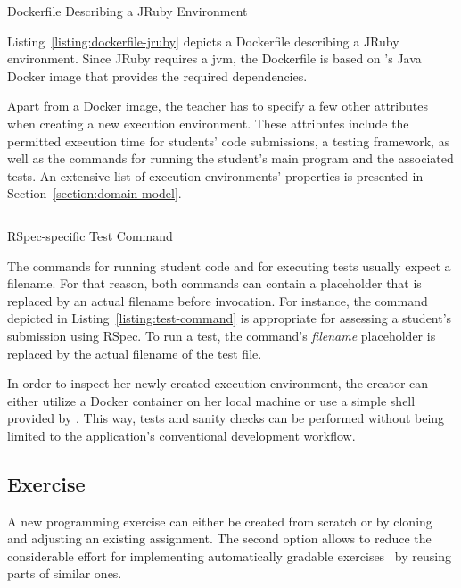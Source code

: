 \begin{listing}
\inputminted[frame=lines]{Dockerfile}{listings/Dockerfile-jruby}
\vspace{-0.33cm}
\caption{Dockerfile Describing a JRuby Environment}
\label{listing:dockerfile-jruby}
\end{listing}

Listing~\ref{listing:dockerfile-jruby} depicts a Dockerfile describing a JRuby environment. Since JRuby requires a \gls{jvm}, the Dockerfile is based on \tool's Java Docker image that provides the required dependencies.

Apart from a Docker image, the teacher has to specify a few other attributes when creating a new execution environment. These attributes include the permitted execution time for students' code submissions, a testing framework, as well as the commands for running the student's main program and the associated tests. An extensive list of execution environments' properties is presented in Section~\ref{section:domain-model}.

\begin{listing}
\inputminted[frame=lines]{text}{listings/test-command.txt}
\vspace{-0.33cm}
\caption{RSpec-specific Test Command}
\label{listing:test-command}
\end{listing}

The commands for running student code and for executing tests usually expect a filename. For that reason, both commands can contain a placeholder that is replaced by an actual filename before invocation. For instance, the command depicted in Listing~\ref{listing:test-command} is appropriate for assessing a student's submission using RSpec. To run a test, the command's \emph{filename} placeholder is replaced by the actual filename of the test file.

In order to inspect her newly created execution environment, the creator can either utilize a Docker container on her local machine or use a simple shell provided by \tool. This way, tests and sanity checks can be performed without being limited to the application's conventional development workflow.

\subsection{Exercise}

A new programming exercise can either be created from scratch or by cloning and adjusting an existing assignment. The second option allows to reduce the considerable effort for implementing automatically gradable exercises~\cite{pieterse2013automated} by reusing parts of similar ones.

